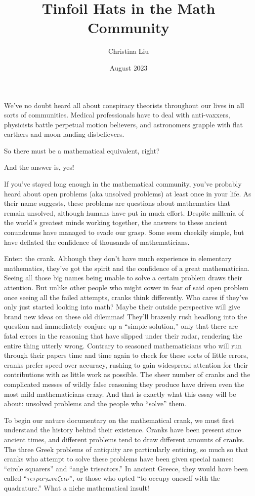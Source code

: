 \documentclass{article}
\title{Tinfoil Hats in the Math Community}
\author{Christina Liu}
\date{August 2023}
\begin{document}
\maketitle

We’ve no doubt heard all about conspiracy theorists throughout our lives in all sorts of communities. Medical professionals have to deal with anti-vaxxers, physicists battle perpetual motion believers, and astronomers grapple with flat earthers and moon landing disbelievers.

So there must be a mathematical equivalent, right?

And the answer is, yes!

If you’ve stayed long enough in the mathematical community, you’ve probably heard about open problems (aka unsolved problems) at least once in your life. As their name suggests, these problems are questions about mathematics that remain unsolved, although humans have put in much effort. Despite millenia of the world’s greatest minds working together, the answers to these ancient conundrums have managed to evade our grasp. Some seem cheekily simple, but have deflated the confidence of thousands of mathematicians.

Enter: the crank. Although they don’t have much experience in elementary mathematics, they’ve got the spirit and the confidence of a great mathematician. Seeing all those big names being unable to solve a certain problem draws their attention. But unlike other people who might cower in fear of said open problem once seeing all the failed attempts, cranks think differently. Who cares if they’ve only just started looking into math? Maybe their outside perspective will give brand new ideas on these old dilemmas! They’ll brazenly rush headlong into the question and immediately conjure up a ``simple solution,'' only that there are fatal errors in the reasoning that have slipped under their radar, rendering the entire thing utterly wrong. Contrary to seasoned mathematicians who will run through their papers time and time again to check for these sorts of little errors, cranks prefer speed over accuracy, rushing to gain widespread attention for their contributions with as little work as possible. The sheer number of cranks and the complicated messes of wildly false reasoning they produce have driven even the most mild mathematicians crazy.
And that is exactly what this essay will be about: unsolved problems and the people who ``solve'' them.

To begin our nature documentary on the mathematical crank, we must first understand the history behind their existence. Cranks have been present since ancient times, and different problems tend to draw different amounts of cranks. The three Greek problems of antiquity are particularly enticing, so much so that cranks who attempt to solve these problems have been given special names: ``circle squarers'' and ``angle trisectors.'' In ancient Greece, they would have been called ``$\tau\epsilon\tau\rho\alpha\gamma\omega\nu\iota\zeta\epsilon\iota\nu$'', or those who opted ``to occupy oneself with the quadrature.'' What a niche mathematical insult!
\end{document}
